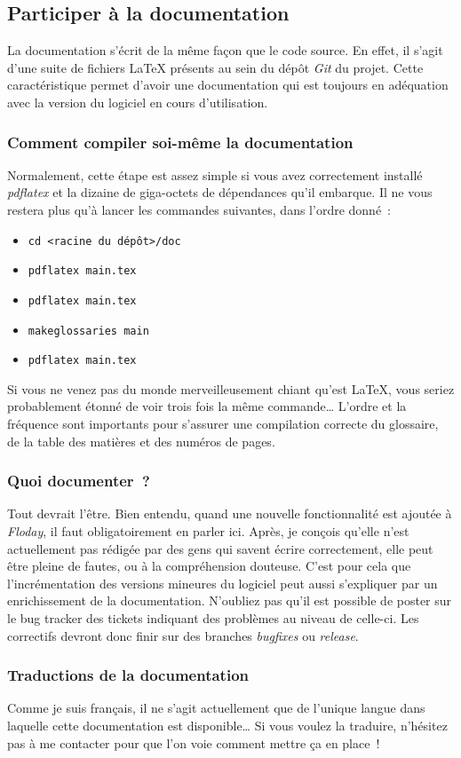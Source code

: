 \subsection{Participer à la documentation}

La documentation s'écrit de la même façon que le code source.
En effet, il s'agit d'une suite de fichiers \LaTeX{} présents au sein du dépôt \emph{Git} du projet.
Cette caractéristique permet d'avoir une documentation qui est toujours en adéquation avec la version du logiciel en cours d'utilisation.

\subsubsection{Comment compiler soi-même la documentation}

Normalement, cette étape est assez simple si vous avez correctement installé \emph{pdflatex} et la dizaine de giga-octets de dépendances qu'il embarque.
Il ne vous restera plus qu'à lancer les commandes suivantes, dans l'ordre donné~:
\begin{itemize}
	\item{\tt cd <racine du dépôt>/doc}
	\item{\tt pdflatex main.tex}
	\item{\tt pdflatex main.tex}
	\item{\tt makeglossaries main}
	\item{\tt pdflatex main.tex}
\end{itemize}
Si vous ne venez pas du monde merveilleusement chiant qu'est \LaTeX, vous seriez probablement étonné de voir trois fois la même commande\dots{}
L'ordre et la fréquence sont importants pour s'assurer une compilation correcte du glossaire, de la table des matières et des numéros de pages.

\subsubsection{Quoi documenter~?}
Tout devrait l'être.
Bien entendu, quand une nouvelle fonctionnalité est ajoutée à \emph{Floday}, il faut obligatoirement en parler ici.
Après, je conçois qu'elle n'est actuellement pas rédigée par des gens qui savent écrire correctement, elle peut être pleine de fautes, ou à la compréhension douteuse.
C'est pour cela que l'incrémentation des versions mineures du logiciel peut aussi s'expliquer par un enrichissement de la documentation.
N'oubliez pas qu'il est possible de poster sur le bug tracker des tickets indiquant des problèmes au niveau de celle-ci.
Les correctifs devront donc finir sur des branches \emph{bugfixes} ou \emph{release}.

\subsubsection{Traductions de la documentation}
Comme je suis français, il ne s'agit actuellement que de l'unique langue dans laquelle cette documentation est disponible\dots{}
Si vous voulez la traduire, n'hésitez pas à me contacter pour que l'on voie comment mettre ça en place~!
